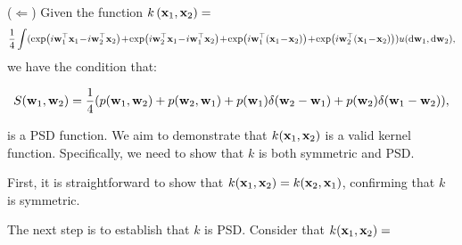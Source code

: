 \vspace{.2in}
($\Longleftarrow$) 
Given the function $k\left({\mathbf x}_1, {\mathbf x}_2\right) = $
\begin{equation}
\begin{aligned}
\frac{1}{4} \int (
 \exp(i\w_1^{\top} \x_1\! -\! i\w_2^{\top} \x_2)\! +\! \exp(i\w_2^{\top} \x_1\! -\! i\w_1^{\top} \x_2)\! +\! \exp(i\w_1^{\top}( \x_1\! - \! \x_2)) \!+\! \exp(i\w_2^{\top} (\x_1\! -\! \x_2)) )
u(\mathrm{d}\w_1, \mathrm{d} \w_2),
\end{aligned}
\end{equation}
we have the condition that:

\begin{equation}
\setlength{\abovedisplayskip}{3pt}
\setlength{\belowdisplayskip}{3pt}
\begin{aligned}
S(\w_1, \w_2) = \frac{1}{4}(p(\w_1, \w_2) + p(\w_2, \w_1) + p(\w_1)\delta(\w_2 - \w_1) + p(\w_2)\delta(\w_1 - \w_2)),
\end{aligned}
\end{equation}

is a PSD function. 
We aim to demonstrate that \(k({\mathbf x}_1, {\mathbf x}_2)\) is a valid kernel function. 
Specifically, we need to show that \(k\) is both symmetric and PSD.

First, it is straightforward to show that \(k({\mathbf x}_1, {\mathbf x}_2) = k({\mathbf x}_2, {\mathbf x}_1)\), confirming that \(k\) is symmetric.

The next step is to establish that \(k\) is PSD. Consider that \(k({\mathbf x}_1, {\mathbf x}_2) = \)

